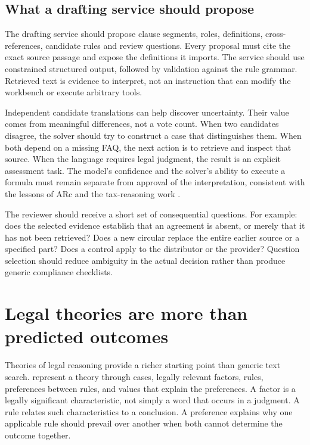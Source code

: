 \documentclass[12pt,a4paper,oneside,openany]{book}
\begin{document}
\subsection{What a drafting service should propose}
\label{merge:P-03-product:08}


The drafting service should propose clause segments, roles, definitions,
cross-references, candidate rules and review questions. Every proposal must cite
the exact source passage and expose the definitions it imports. The service
should use constrained structured output, followed by validation against the
rule grammar. Retrieved text is evidence to interpret, not an instruction that
can modify the workbench or execute arbitrary tools.

Independent candidate translations can help discover uncertainty. Their value
comes from meaningful differences, not a vote count. When two candidates disagree,
the solver should try to construct a case that distinguishes them. When both
depend on a missing FAQ, the next action is to retrieve and inspect that source.
When the language requires legal judgment, the result is an explicit assessment
task. The model's confidence and the solver's ability to execute a formula must
remain separate from approval of the interpretation, consistent with the lessons
of ARc and the tax-reasoning work \citep{arc2025,jurayj2026}.

The reviewer should receive a short set of consequential questions. For example:
does the selected evidence establish that an agreement is absent, or merely that
it has not been retrieved? Does a new circular replace the entire earlier source
or a specified part? Does a control apply to the distributor or the provider?
Question selection should reduce ambiguity in the actual decision rather than
produce generic compliance checklists.

\section{Legal theories are more than predicted outcomes}
\label{merge:M05:01}


Theories of legal reasoning provide a richer starting point than generic text
search. \citet[sections 3--5]{theories2003} represent a theory through cases,
legally relevant factors, rules, preferences between rules, and values that
explain the preferences. A factor is a legally significant characteristic, not
simply a word that occurs in a judgment. A rule relates such characteristics to a
conclusion. A preference explains why one applicable rule should prevail over
another when both cannot determine the outcome together.
\end{document}
